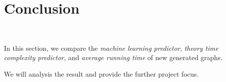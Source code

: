 \section{Conclusion}~\label{sec.Conclusion}

In this section, we compare the \textit{machine learning predictor}, \textit{theory time complexity predictor}, and \textit{average running time} of new generated graphs.

We will analysis the result and provide the further project focus.